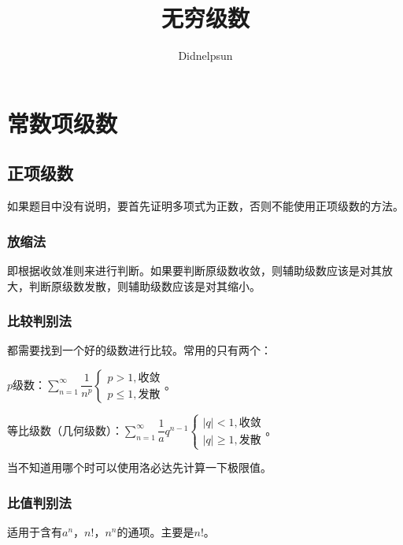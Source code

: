 \documentclass[UTF8, 12pt]{ctexart}
\author{Didnelpsun}
\title{无穷级数}
\date{}
\begin{document}
\maketitle
\pagestyle{empty}
\thispagestyle{empty}
\tableofcontents
\thispagestyle{empty}
\newpage
\pagestyle{plain}
\setcounter{page}{1}
\section{常数项级数}

\subsection{正项级数}

如果题目中没有说明，要首先证明多项式为正数，否则不能使用正项级数的方法。

\subsubsection{放缩法}

即根据收敛准则来进行判断。如果要判断原级数收敛，则辅助级数应该是对其放大，判断原级数发散，则辅助级数应该是对其缩小。

\subsubsection{比较判别法}

都需要找到一个好的级数进行比较。常用的只有两个：

$p$级数：$\sum\limits_{n=1}^\infty\dfrac{1}{n^p}\left\{\begin{array}{l}
    p>1, \text{收敛} \\
    p\leqslant1, \text{发散}
\end{array}\right.$。

等比级数（几何级数）：$\sum\limits_{n=1}^\infty\dfrac{1}aq^{n-1}\left\{\begin{array}{l}
    \vert q\vert<1, \text{收敛} \\
    \vert q\vert\geqslant 1, \text{发散}
\end{array}\right.$。

当不知道用哪个时可以使用洛必达先计算一下极限值。

\subsubsection{比值判别法}

适用于含有$a^n$，$n!$，$n^n$的通项。主要是$n!$。
\end{document}
